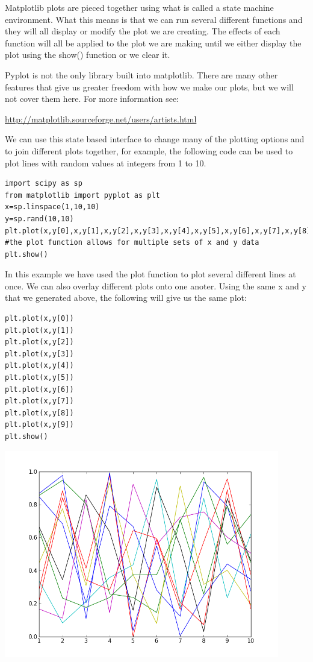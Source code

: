 Matplotlib plots are pieced together using what is called a state machine environment. What this means is that we can run several different functions and they will all display or modify the plot we are creating. The effects of each function will all be applied to the plot we are making until we either display the plot using the show() function or we clear it.

Pyplot is not the only library built into matplotlib. There are many other features that give us greater freedom with how we make our plots, but we will not cover them here. For more information see: 

\url{http://matplotlib.sourceforge.net/users/artists.html}

We can use this state based interface to change many of the plotting options and to join different plots together, for example, the following code can be used to plot lines with random values at integers from 1 to 10.

\begin{lstlisting}
import scipy as sp
from matplotlib import pyplot as plt
x=sp.linspace(1,10,10)
y=sp.rand(10,10)
plt.plot(x,y[0],x,y[1],x,y[2],x,y[3],x,y[4],x,y[5],x,y[6],x,y[7],x,y[8],x,y[9])  #the plot function allows for multiple sets of x and y data
plt.show()
\end{lstlisting}

In this example we have used the plot function to plot several different lines at once. We can also overlay different plots onto one anoter. Using the same x and y that we generated above, the following will give us the same plot:

\begin{lstlisting}
plt.plot(x,y[0])
plt.plot(x,y[1])
plt.plot(x,y[2])
plt.plot(x,y[3])
plt.plot(x,y[4])
plt.plot(x,y[5])
plt.plot(x,y[6])
plt.plot(x,y[7])
plt.plot(x,y[8])
plt.plot(x,y[9])
plt.show()
\end{lstlisting}

\includegraphics[width=120mm]{statemachineexample.png}

